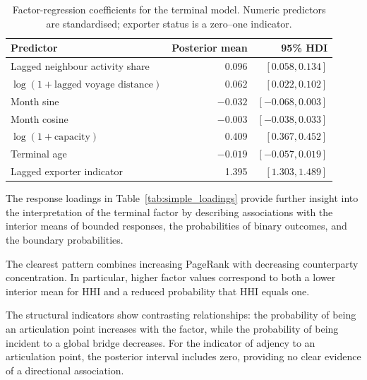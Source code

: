 \documentclass[pdftex,12pt,openright,a4paper,oneside]{book}
\begin{document}
\begin{table}[htbp]
\centering
\caption{Factor-regression coefficients for the terminal model.
Numeric predictors are standardised; exporter status is a
zero--one indicator.}
\label{tab:simple_beta}
\begin{tabular}{lrr}
\hline
Predictor & Posterior mean & 95\% HDI \\
\hline
Lagged neighbour activity share & 0.096 & $[0.058,0.134]$ \\
$\log(1+\text{lagged voyage distance})$ & 0.062 & $[0.022,0.102]$ \\
Month sine & $-0.032$ & $[-0.068,0.003]$ \\
Month cosine & $-0.003$ & $[-0.038,0.033]$ \\
$\log(1+\text{capacity})$ & 0.409 & $[0.367,0.452]$ \\
Terminal age & $-0.019$ & $[-0.057,0.019]$ \\
Lagged exporter indicator & 1.395 & $[1.303,1.489]$ \\
\hline
\end{tabular}
\end{table}

The response loadings in Table~\ref{tab:simple_loadings}
provide further insight into the interpretation of the
terminal factor by describing associations with the
interior means of bounded responses, the probabilities
of binary outcomes, and the boundary probabilities.

The clearest pattern combines increasing PageRank with
decreasing counterparty concentration. In particular,
higher factor values correspond to both a lower interior
mean for HHI and a reduced probability that HHI equals one.

The structural indicators show contrasting relationships:
the probability of being an articulation point increases
with the factor, while the probability of being incident to a global
bridge decreases. For the indicator of adjency to an articulation point,
the posterior interval includes zero, providing no clear
evidence of a directional association.
\end{document}
